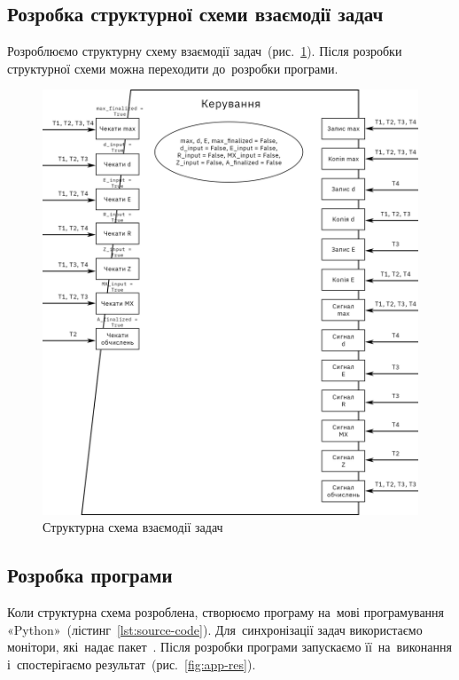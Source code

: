 \documentclass[
  a4paper,
  oneside,
  BCOR = 10mm,
  DIV = 12,
  12pt,
  headings = normal,
]{scrartcl}
\begin{document}
    \subsection{Розробка структурної схеми взаємодії задач}
      Розроблюємо структурну схему взаємодії задач~(рис.~\ref{fig:struct-interaction}). Після розробки структурної схеми можна переходити до~розробки програми.
			\begin{figure}[!htbp]
				\centering
				\includegraphics[width=\columnwidth]{./assets/struct-diag.png}
				\caption{Структурна схема взаємодії задач}
				\label{fig:struct-interaction}
      \end{figure}

    \subsection{Розробка програми}
			Коли структурна схема розроблена, створюємо програму на~мові програмування «\textenglish{Python}»~(лістинг~\ref{lst:source-code}). Для~синхронізації задач використаємо монітори, які~надає пакет~. Після розробки програми запускаємо її~на~виконання і~спостерігаємо результат~(рис.~\ref{fig:app-res}).
\end{document}
